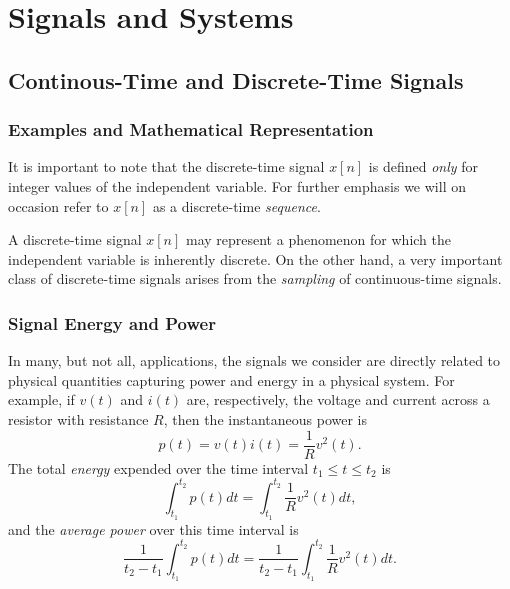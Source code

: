 \documentclass[a4paper,twoside]{book}
\begin{document}

\restoregeometry
\thispagestyle{empty}
\setcounter{page}{0}
\tableofcontents
\thispagestyle{empty}
\setcounter{page}{0}

\chapter{Signals and Systems}
\label{chapter:1}

\section{Continous-Time and Discrete-Time Signals}
\subsection{Examples and Mathematical Representation}

It is important to note that the discrete-time signal $x[n]$ is defined \textit{only} for integer values of the independent variable. For further emphasis we will on occasion refer to $x[n]$ as a discrete-time \textit{sequence}.

A discrete-time signal $x[n]$ may represent a phenomenon for which the independent variable is inherently discrete. On the other hand, a very important class of discrete-time signals arises from the \textit{sampling} of continuous-time signals.

\subsection{Signal Energy and Power}

In many, but not all, applications, the signals we consider are directly related to physical quantities capturing power and energy in a physical system. For example, if $v(t)$ and $i(t)$ are, respectively, the voltage and current across a resistor with resistance $R$, then the instantaneous power is
\begin{equation}
    p(t)=v(t)i(t)=\dfrac{1}{R}v^2(t).
    \label{1.1}
\end{equation}
The total \textit{energy} expended over the time interval $t_1\le t\le t_2$ is
\begin{equation}
    \int_{t_{1}}^{t_{2}}p(t) dt = \int_{t_{1}}^{t_{2}}\frac{1}{R}v^{2}(t) dt,
    \label{1.2}
\end{equation}
and the \textit{average power} over this time interval is
\begin{equation}
    \frac{1}{t_{2}-t_{1}}\int_{t_{1}}^{t_{2}}p(t) dt = \frac{1}{t_{2}-t_{1}}\int_{t_{1}}^{t_{2}}\frac{1}{R}v^{2}(t) dt.
\end{equation}
\end{document}
